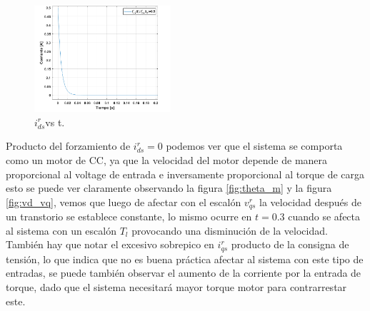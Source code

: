 \documentclass[10pt]{article}
\begin{document}
\begin{itemize}
	\begin{figure}[h!]
	\centering
	\includegraphics[width=0.45\textwidth]{ids.png}
	\caption{\label{fig:ids} $i^{r}_{ds}$vs t.}
	\end{figure}
	Producto del forzamiento de $i^{r}_{ds}=0$ podemos ver que el sistema se comporta como un motor de CC, ya que la velocidad del motor depende de manera proporcional al voltage de entrada e inversamente proporcional al torque de carga esto se puede ver claramente observando la figura \ref{fig:theta_m} y la figura \ref{fig:vd_vq}, vemos que luego de afectar con el escalón $v^{r}_{qs}$ la velocidad después de un transtorio se establece constante, lo mismo ocurre en $t=0.3$ cuando se afecta al sistema con un escalón $T_{l}$ provocando una disminución de la velocidad. También hay que notar el excesivo sobrepico en $i^{r}_{qs}$ producto de la consigna de tensión, lo que indica que no es buena práctica afectar al sistema con este tipo de entradas, se puede también observar el aumento de la corriente por la entrada de torque, dado que el sistema necesitará mayor torque motor para contrarrestar este. \\
	

\end{itemize}
\end{document}
